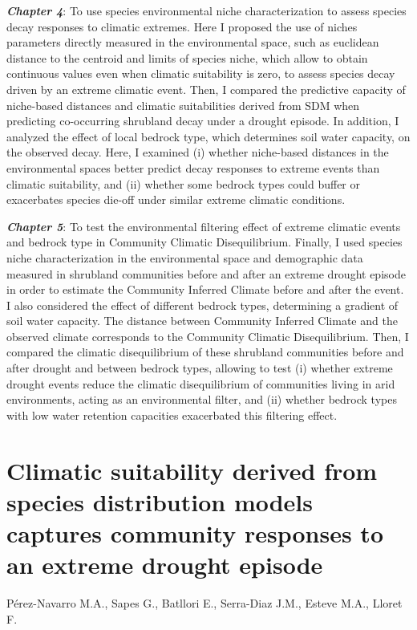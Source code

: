\documentclass[11pt,twoside]{reedthesis}
\begin{document}
\textbf{\emph{Chapter 4}}: To use species environmental niche
characterization to assess species decay responses to climatic extremes.
Here I proposed the use of niches parameters directly measured in the
environmental space, such as euclidean distance to the centroid and
limits of species niche, which allow to obtain continuous values even
when climatic suitability is zero, to assess species decay driven by an
extreme climatic event. Then, I compared the predictive capacity of
niche-based distances and climatic suitabilities derived from SDM when
predicting co-occurring shrubland decay under a drought episode. In
addition, I analyzed the effect of local bedrock type, which determines
soil water capacity, on the observed decay. Here, I examined (i) whether
niche-based distances in the environmental spaces better predict decay
responses to extreme events than climatic suitability, and (ii) whether
some bedrock types could buffer or exacerbates species die-off under
similar extreme climatic conditions.\par

\textbf{\emph{Chapter 5}}: To test the environmental filtering effect of
extreme climatic events and bedrock type in Community Climatic
Disequilibrium. Finally, I used species niche characterization in the
environmental space and demographic data measured in shrubland
communities before and after an extreme drought episode in order to
estimate the Community Inferred Climate before and after the event. I
also considered the effect of different bedrock types, determining a
gradient of soil water capacity. The distance between Community Inferred
Climate and the observed climate corresponds to the Community Climatic
Disequilibrium. Then, I compared the climatic disequilibrium of these
shrubland communities before and after drought and between bedrock
types, allowing to test (i) whether extreme drought events reduce the
climatic disequilibrium of communities living in arid environments,
acting as an environmental filter, and (ii) whether bedrock types with
low water retention capacities exacerbated this filtering effect.

\chapter[Population climatic suitability and extreme drought responses]{Climatic suitability derived from species distribution models captures community responses to an extreme drought episode}

\setlength{\parindent}{0pt} Pérez-Navarro M.A., Sapes G., Batllori E.,
Serra-Diaz J.M., Esteve M.A., Lloret F. \newpage
\setlength{\parindent}{30pt}
\end{document}
